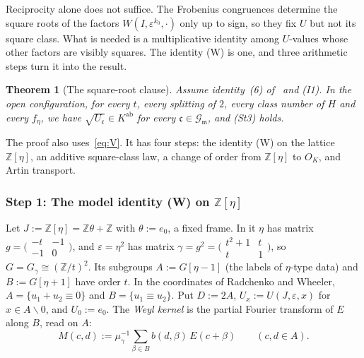 \documentclass[11pt]{amsart}
\numberwithin{equation}{section}
\theoremstyle{plain}
\newtheorem{theorem}{Theorem}[section]
\theoremstyle{definition}
\theoremstyle{remark}
\begin{document}
Reciprocity alone does not suffice. The Frobenius congruences determine the square roots of the factors \(W(I,\varepsilon^{k_0},\cdot)\) only up to sign, so they fix \(U\) but not its square class. What is needed is a multiplicative identity among \(U\)-values whose other factors are visibly squares. The identity (W) is one, and three arithmetic steps turn it into the result.

\begin{theorem}[The square-root clause]\label{thm:st3}
Assume identity~(6) of~\cite{RW} and (I1). In the open configuration, for every \(t\), every splitting of \(2\), every class number of \(H\) and every \(f_\eta\), we have \(\sqrt{U_{\mathfrak c}}\in K^{\mathrm{ab}}\) for every \(\mathfrak c\in\mathcal G_{\mathfrak m}\), and (St3) holds.
\end{theorem}

The proof also uses~\eqref{eq:V}. It has four steps: the identity (W) on the lattice \(\mathbb Z[\eta]\), an additive square-class law, a change of order from \(\mathbb Z[\eta]\) to \(O_K\), and Artin transport.

\subsubsection*{Step 1: The model identity (W) on \(\mathbb Z[\eta]\)}

Let \(J:=\mathbb Z[\eta]=\mathbb Z\theta+\mathbb Z\) with \(\theta:=e_0\), a fixed frame. In it \(\eta\) has matrix \(g=\bigl(\begin{smallmatrix}-t&-1\\-1&0\end{smallmatrix}\bigr)\), and \(\varepsilon=\eta^2\) has matrix \(\gamma=g^2=\bigl(\begin{smallmatrix}t^2+1&t\\t&1\end{smallmatrix}\bigr)\), so \(G=G_\gamma\cong(\mathbb Z/t)^2\). Its subgroups \(A:=G[\eta-1]\) (the labels of \(\eta\)-type data) and \(B:=G[\eta+1]\) have order \(t\). In the coordinates of Radchenko and Wheeler, \(A=\{u_1+u_2\equiv0\}\) and \(B=\{u_1\equiv u_2\}\). Put \(D:=2A\), \(U_x:=U(J,\varepsilon,x)\) for \(x\in A\smallsetminus0\), and \(U_0:=e_0\). The \emph{Weyl kernel} is the partial Fourier transform of \(E\) along \(B\), read on \(A\):
\[M(c,d):=\mu_\gamma^{-1}\sum_{\beta\in B}b(d,\beta)\,E(c+\beta)\qquad(c,d\in A).\]
\end{document}

